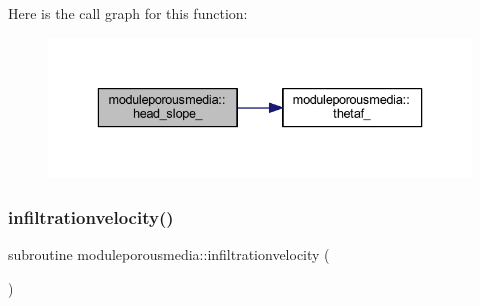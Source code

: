 Here is the call graph for this function\+:\nopagebreak
\begin{figure}[H]
\begin{center}
\leavevmode
\includegraphics[width=336pt]{namespacemoduleporousmedia_a3c4b0e307933259bb0fd3bb97624a021_cgraph}
\end{center}
\end{figure}
\mbox{\label{namespacemoduleporousmedia_a42b31332e78c6e4efb8f6b4c8c1bc569}} 
\subsubsection{\texorpdfstring{infiltrationvelocity()}{infiltrationvelocity()}}
{\footnotesize\ttfamily subroutine moduleporousmedia\+::infiltrationvelocity (\begin{DoxyParamCaption}{ }\end{DoxyParamCaption})\hspace{0.3cm}{\ttfamily [private]}}

